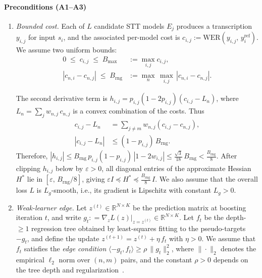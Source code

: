 \documentclass[journal]{IEEEtran}
\begin{document}
    \paragraph{Preconditions (A1--A3)}
    \begin{enumerate}[label=A\arabic{*}., leftmargin=2.0em]
        \item \emph{Bounded cost.} Each of $L$ candidate STT models $E_{j}$
            produces a transcription $y_{i,j}$ for input $s_{i}$, and the associated
            per-model cost is $c_{i,j}:= \mathrm{WER}(y_{i,j}, \,y_i^{\mathrm{ref}})$. We
            assume two uniform bounds:
            \begin{align*}
                0 \;\le\; c_{i,j}\;\le\; B_{\max}           & := \max_{i,j}c_{i,j},                        \\
                |c_{n,i}- c_{n,j}| \;\le\; B_{\mathrm{rng}} & := \max_{n}\,\max_{i,j}\,|c_{n,i}- c_{n,j}|.
            \end{align*}

            The second derivative term is
            $h_{i,j}= p_{i,j}(1-2p_{i,j})(c_{i,j}-L_{n})$, where $L_{n}= \sum_{j}
            w_{n,j}\,c_{n,j}$ is a convex combination of the costs. Thus
            \begin{align*}
                c_{i,j}-L_{n}   & = \sum_{j\neq m}w_{n,j}(c_{i,j}-c_{n,j}), \\
                |c_{i,j}-L_{n}| & \le (1-p_{i,j})\,B_{\mathrm{rng}}.
            \end{align*}
            Therefore, $|h_{i,j}| \le B_{\mathrm{rng}}\,p_{i,j}(1-p_{i,j})\,|1-2w
            _{i,j}| \le \tfrac{\sqrt{3}}{18}\,B_{\mathrm{rng}}< \tfrac{B_{\mathrm{rng}}}
            {8}$. After clipping $h_{i,j}$ below by $\varepsilon>0$, all diagonal
            entries of the approximate Hessian $H^{*}$ lie in $[\varepsilon,\,B_{\mathrm{rng}}
            /8]$, giving
            $\varepsilon I \preceq H^{*}\preceq \tfrac{B_{\mathrm{rng}}}{8}\,I$.
            We also assume that the overall loss $L$ is $L_{g}$-smooth, i.e.,
            its gradient is Lipschitz with constant $L_{g}>0$.

        \item \emph{Weak-learner edge.} Let $z^{(t)}\in\mathbb{R}^{N\times K}$
            be the prediction matrix at boosting iteration $t$, and write $g_{t}:
            = \nabla_{z}L(z)\big|_{z=z^{(t)}}\in \mathbb{R}^{N\times K}$. Let
            $f_{t}$ be the depth-$\!\ge\!1$ regression tree obtained by least-squares
            fitting to the pseudo-targets $-g_{t}$, and define the update $z^{(t+1)}
            = z^{(t)}+ \eta\,f_{t}$ with $\eta>0$. We assume that $f_{t}$
            satisfies the \emph{edge condition} $\langle -g_{t}, f_{t}\rangle \ge
            \rho \,\|g_{t}\|_{2}^{2}$, where $\|\cdot\|_{2}$ denotes the
            empirical $\ell_{2}$ norm over $(n,m)$ pairs, and the constant $\rho>
            0$ depends on the tree depth and regularization~\cite{schapire2012boosting}.


\end{enumerate}
\end{document}
